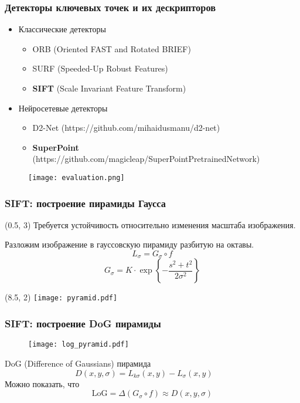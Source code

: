 \documentclass[12pt, usepdftitle=false, aspectratio=1610]{beamer}
\begin{document}
\begin{frame}
\frametitle{Детекторы ключевых точек и их дескрипторов}
\begin{itemize}
    \item Классические детекторы
    \begin{itemize}
        \item ORB (Oriented FAST and Rotated BRIEF)
        \item SURF (Speeded-Up Robust Features)
        \item \textbf{SIFT} (Scale Invariant Feature Transform)
    \end{itemize}
    \item Нейросетевые детекторы
    \begin{itemize}
        \item D2-Net (https://github.com/mihaidusmanu/d2-net)
        \item \textbf{SuperPoint} (https://github.com/magicleap/SuperPointPretrainedNetwork)
    \end{itemize}
\end{itemize}
\begin{figure}
    \centering
    \texttt{[image: evaluation.png]}
\end{figure}
\end{frame}

\begin{frame}
\frametitle{SIFT: построение пирамиды Гаусса}
\begin{textblock}{8}(0.5, 3)
    Требуется устойчивость относительно изменения масштаба изображения.
    \vspace{0.5cm}

    Разложим изображение в гауссовскую пирамиду разбитую на октавы.
    $$
        L_\sigma = G_\sigma \circ f
    $$
    $$
        G_\sigma=K\cdot\exp\left\{-\frac{s^2+t^2}{2\sigma^2}\right\}
    $$
\end{textblock}
\begin{textblock}{5}(8.5, 2)
    \texttt{[image: pyramid.pdf]}
\end{textblock}
\end{frame}

\begin{frame}
\frametitle{SIFT: построение DoG пирамиды}
\begin{figure}
    \texttt{[image: log\_pyramid.pdf]}
\end{figure}
DoG (Difference of Gaussians) пирамида
$$
    D(x,y,\sigma)=L_{k\sigma}(x,y)-L_{\sigma}(x,y)\qquad
$$
Можно показать, что
$$
    \mathrm{LoG}=\Delta \left(G_\sigma\circ f\right)\approx D(x,y,\sigma)
$$
\end{frame}
\end{document}
